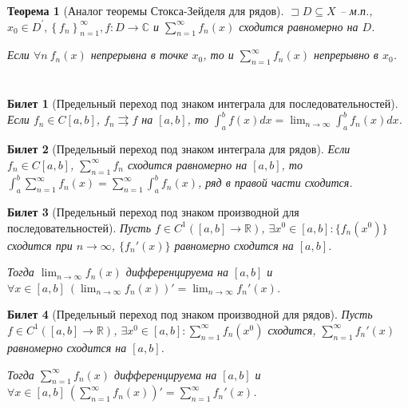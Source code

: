 \documentclass[11pt,a4paper,oneside]{scrartcl}
\newtheorem*{theorem}{Теорема}
\newtheorem{ticket}{Билет}
\begin{document}
\begin{theorem}[Аналог теоремы Стокса-Зейделя для рядов]
    $\sqsupset D\subseteq X$ -- м.п., $x_0\in  D^{'},   \left\{ f_n \right\}_{n=1}^{\infty },
    f:D \to \mathbb{C}$ и $\sum_{n=1}^{\infty } f_n(x)$ сходится равномерно на $D$.

    Если  $\forall n ~ f_n(x)$ непрерывна в точке $x_0$, то
    и $\sum_{n=1}^{\infty } f_n(x)$ непрерывно в $x_0$.
\end{theorem}

\section*{}

\setcounter{ticket}{32}
\addtocounter{ticket}{-1}
\begin{ticket}[Предельный переход под знаком интеграла для последовательностей]
    Если $f_n \in C[a, b]$, $f_n \rightrightarrows f$ на $[a, b]$,
    то $\int_a^b f(x)dx = \lim_{n \rightarrow \infty} \int_a^b f_n (x)dx$.
\end{ticket}

\addtocounter{ticket}{-1}
\begin{ticket}[Предельный переход под знаком интеграла для рядов]
    Если $f_n \in C[a, b]$, $\sum_{n=1}^\infty f_n$ сходится равномерно на $[a, b]$,
    то $\int_a^b \sum_{n=1}^\infty f_n(x) = \sum_{n=1}^\infty \int_a^b f_n(x)$,
    ряд в правой части сходится.
\end{ticket}

\setcounter{ticket}{33}
\addtocounter{ticket}{-1}
\begin{ticket}[Предельный переход под знаком производной для последовательностей]
    Пусть $f \in C^1([a, b] \rightarrow \mathbb{R})$,
    $\exists x^0 \in [a, b] : \{f_n(x^0)\}$ сходится при $n \rightarrow \infty$,
    $\{f_n'(x)\}$ равномерно сходится на $[a, b]$.

    Тогда $\lim_{n \rightarrow \infty} f_n(x)$ дифференцируема на $[a, b]$
    и $\forall x \in [a, b] \
    (\lim_{n \rightarrow \infty} f_n(x))' = \lim_{n \rightarrow \infty} f_n'(x)$.
\end{ticket}

\addtocounter{ticket}{-1}
\begin{ticket}[Предельный переход под знаком производной для рядов]
    Пусть $f \in C^1([a, b] \rightarrow \mathbb{R})$,
    $\exists x^0 \in [a, b] : \sum_{n=1}^\infty f_n(x^0)$ сходится,
    $\sum_{n=1}^\infty f_n'(x)$ равномерно сходится на $[a, b]$.

    Тогда $\sum_{n=1}^\infty f_n(x)$ дифференцируема на $[a, b]$
    и $\forall x \in [a, b] \ (\sum_{n=1}^\infty f_n(x))' = \sum_{n=1}^\infty f_n'(x)$.
\end{ticket}
\end{document}
